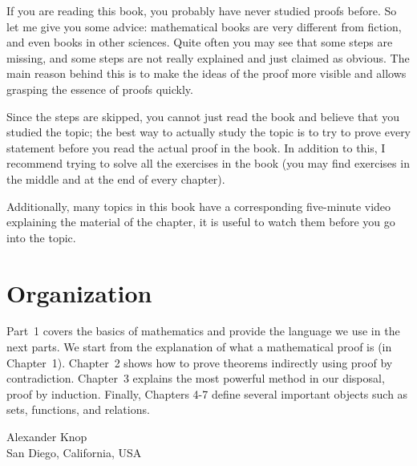 If you are reading this book, you probably have never studied proofs before. So let me give you some advice: mathematical books are very different from fiction, and even books in other sciences. Quite often you may see that some steps are missing, and some steps are not really explained and just claimed as obvious. The main reason behind this is to make the ideas of the proof more visible and allows grasping the essence of proofs quickly.

Since the steps are skipped, you cannot just read the book and believe that you studied the topic; the best way to actually study the topic is to try to prove every statement before you read the actual proof in the book. In addition to this, I recommend trying to solve all the exercises in the book (you may find exercises in the middle and at the end of every chapter).

Additionally, many topics in this book have a corresponding five-minute video explaining the material of the chapter, it is useful to watch them before you go into the topic.

\section*{Organization}
Part~1 covers the basics of mathematics and provide the language we use in the next parts. We start from the explanation of what a mathematical proof is (in Chapter~1). Chapter~2 shows how to prove theorems indirectly using proof by contradiction. Chapter~3 explains the most powerful method in our disposal, proof by induction. Finally, Chapters 4-7 define several important objects such as sets, functions, and relations.

\begin{flushright}
  Alexander Knop \\
  San Diego, California, USA
\end{flushright}
